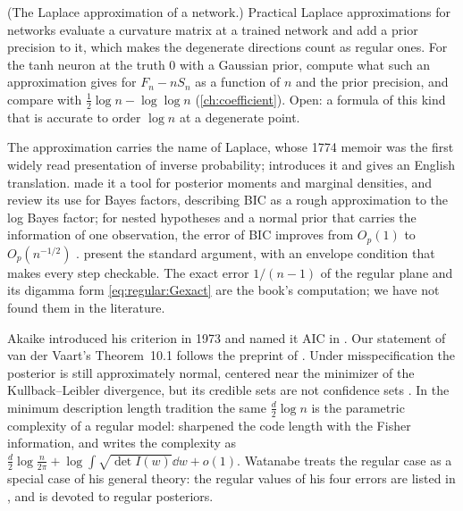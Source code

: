 \begin{refsection}
\begin{exercises}
\item \research (The Laplace approximation of a network.) Practical Laplace approximations for networks \parencite{MacKay1992,DaxbergerEtAl2021} evaluate a curvature matrix at a trained network and add a prior precision to it, which makes the degenerate directions count as regular ones. For the tanh neuron at the truth $0$ with a Gaussian prior, compute what such an approximation gives for $F_n-nS_n$ as a function of $n$ and the prior precision, and compare with $\frac12\log n-\log\log n$ (\cref{ch:coefficient}). Open: a formula of this kind that is accurate to order $\log n$ at a degenerate point.\label{ex:regular:network}
\end{exercises}

\notesandrefs

The approximation carries the name of Laplace, whose 1774 memoir was the first widely read presentation of inverse probability; \textcite{Stigler1986} introduces it and gives an English translation. \Textcite{TierneyKadane1986} made it a tool for posterior moments and marginal densities, and \textcite{KassRaftery1995} review its use for Bayes factors, describing BIC as a rough approximation to the log Bayes factor; for nested hypotheses and a normal prior that carries the information of one observation, the error of BIC improves from $O_p(1)$ to $O_p(n^{-1/2})$ \parencite{KassWasserman1995}.  present the standard argument, with an envelope condition that makes every step checkable. The exact error $1/(n-1)$ of the regular plane and its digamma form \eqref{eq:regular:Gexact} are the book's computation; we have not found them in the literature.

Akaike introduced his criterion in 1973 \parencite{Akaike1998} and named it AIC in \textcite{Akaike1974}. Our statement of van der Vaart's Theorem~10.1 follows the preprint of \textcite[Theorem~1]{RequadtEtAl2025}. Under misspecification the posterior is still approximately normal, centered near the minimizer of the Kullback--Leibler divergence, but its credible sets are not confidence sets \parencite{KleijnVanderVaart2012}. In the minimum description length tradition the same $\frac d2\log n$ is the parametric complexity of a regular model: \textcite{Rissanen1996} sharpened the code length with the Fisher information, and \textcite[eq.~(2.21)]{Grunwald2004} writes the complexity as $\frac d2\log\frac n{2\pi}+\log\int\sqrt{\det I(w)}\dd w+o(1)$. Watanabe treats the regular case as a special case of his general theory: the regular values of his four errors are listed in \textcite{Watanabe2010a}, and \textcite[Chapter~4]{Watanabe2018} is devoted to regular posteriors.


\end{refsection}
